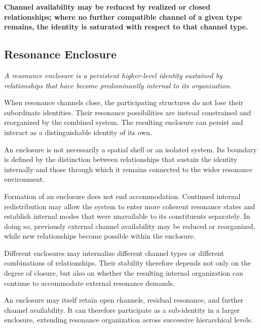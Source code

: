 \documentclass[11pt,a4paper]{article}
\begin{document}
\textbf{Channel availability may be reduced by realized or closed relationships; where no further compatible channel of a given type remains, the identity is saturated with respect to that channel type.}


\subsection{Resonance Enclosure}


\emph{A resonance enclosure is a persistent higher-level identity sustained by relationships that have become predominantly internal to its organization.}

When resonance channels close, the participating structures do not lose their subordinate identities. Their resonance possibilities are instead constrained and reorganized by the combined system. The resulting enclosure can persist and interact as a distinguishable identity of its own.

An enclosure is not necessarily a spatial shell or an isolated system. Its boundary is defined by the distinction between relationships that sustain the identity internally and those through which it remains connected to the wider resonance environment.

Formation of an enclosure does not end accommodation. Continued internal redistribution may allow the system to enter more coherent resonance states and establish internal modes that were unavailable to its constituents separately. In doing so, previously external channel availability may be reduced or reorganized, while new relationships become possible within the enclosure.

Different enclosures may internalize different channel types or different combinations of relationships. Their stability therefore depends not only on the degree of closure, but also on whether the resulting internal organization can continue to accommodate external resonance demands.

An enclosure may itself retain open channels, residual resonance, and further channel availability. It can therefore participate as a sub-identity in a larger enclosure, extending resonance organization across successive hierarchical levels.


\end{document}
